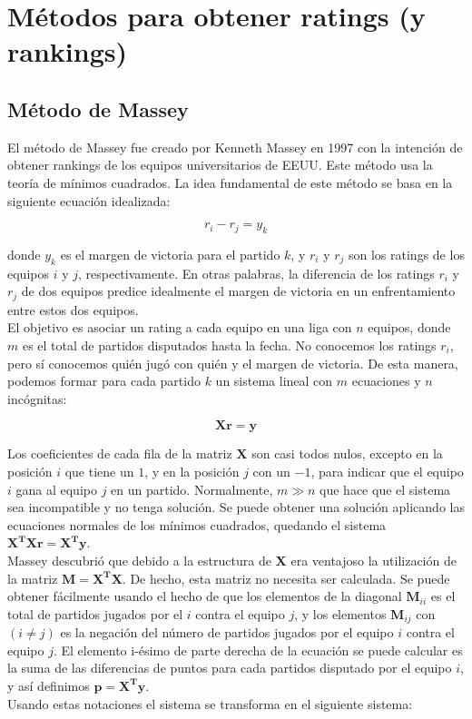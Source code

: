 \section{Métodos para obtener ratings (y rankings)}
\subsection{Método de Massey}
El método de Massey fue creado por Kenneth Massey en 1997 con la intención de obtener rankings de los equipos universitarios de EEUU. Este método usa la teoría de mínimos cuadrados. La idea fundamental de este método se basa en la siguiente ecuación idealizada:

\begin{equation}
r_i - r_j = y_k
\end{equation} 

donde $y_k$ es el margen de victoria para el partido $k$, y $r_i$ y $r_j$ son los ratings de los equipos $i$ y $j$, respectivamente. En otras palabras, la diferencia de los ratings $r_i$ y $r_j$ de dos equipos predice idealmente el margen de victoria en un enfrentamiento entre estos dos equipos. \\

El objetivo es asociar un rating a cada equipo en una liga con $n$ equipos, donde $m$ es el total de partidos disputados hasta la fecha. No conocemos los ratings $r_i$, pero sí conocemos quién jugó con quién y el margen de victoria. De esta manera, podemos formar para cada partido $k$ un sistema lineal con $m$ ecuaciones y $n$ incógnitas:

\[\mathbf{X r } = \mathbf{y}\]

Los coeficientes de cada fila de la matriz $\mathbf{X}$ son casi todos nulos, excepto en la posición $i$ que tiene un $1$, y en la posición $j$ con un $-1$, para indicar que el equipo $i$ gana al equipo $j$ en un partido. Normalmente, $m \gg n$ que hace que el sistema sea incompatible y no tenga solución. Se puede obtener una solución aplicando las ecuaciones normales de los mínimos cuadrados, quedando el sistema $\mathbf{X^T X r} = \mathbf{X^T y}$. \\

Massey descubrió que debido a la estructura de $\mathbf{X}$ era ventajoso la utilización de la matriz $\mathbf{M} = \mathbf{X^T X}$. De hecho, esta matriz no necesita ser calculada. Se puede obtener fácilmente usando el hecho de que los elementos de la diagonal $\mathbf{M}_{ii}$ es el total de partidos jugados por el $i$ contra el equipo $j$, y los elementos $\mathbf{M}_{ij}$ con $(i \neq j)$ es la negación del número de partidos jugados por el equipo $i$ contra el equipo $j$. El elemento i-ésimo de parte derecha de la ecuación se puede calcular es la suma de las diferencias de puntos para cada partidos disputado por el equipo $i$, y así definimos $\mathbf{p} = \mathbf{X^T y}$.\\
Usando estas notaciones el sistema se transforma en el siguiente sistema:

